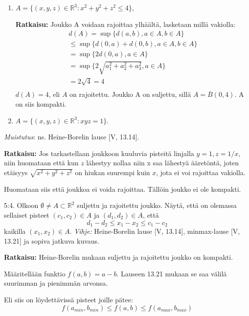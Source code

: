 \documentclass[12pt,a4paper,leqno]{amsart}
\begin{document}
\begin{enumerate}
\item $A = \{(x,y,z) \in \mathbb R^3: x^2 + y^2 + z^2 \le 4\}$, 

\textbf{Ratkaisu: } 
Joukko A voidaan rajoittaa ylhäältä, lasketaan millä vakiolla:
\begin{align*}
    d(A) = \sup \{ d(a, b), a \in A, b \in A\} \\
    \leq \sup \{ d(0, a) + d(0, b), a \in A, b \in A\} \\ 
    = \sup \{ 2 d(0, a), a \in A\}  \\
    = \sup \{ 2 \sqrt{a_1^2 + a_2^2 + a_3^2}, a \in A\} \\
    = 2 \sqrt{4} = 4\\
\end{align*}
$d(A) = 4$, eli $A$ on rajoitettu.
Joukko A on suljettu, sillä $A = \overline{B}(0, 4)$.
A on siis kompakti.
\smallskip

\item $A = \{(x,y,z) \in \mathbb R^3:  xyz = 1\}$.

\end{enumerate}

\textit{Muistutus}: ns. Heine-Borelin lause [V, 13.14].

\textbf{Ratkaisu: }
Jos tarkastellaan joukkoon kuuluvia pisteitä linjalla $y=1, z = 1/x$, niin huomataan että kun $z$ lähestyy nollaa niin x saa lähestyä ääretöntä, joten etäisyys $\sqrt{x^2 + y^2 + z^2}$ on hiukan suurempi kuin $x$, jota ei voi rajoittaa vakiolla.

Huomataan siis että joukkoa ei voida rajoittaa. Tällöin joukko ei ole kompakti.


\bigskip

5:4. Olkoon $\emptyset \neq A \subset \mathbb R^2$ suljettu ja rajoitettu joukko.
Näytä, että on olemassa sellaiset pisteet $(c_1,c_2) \in A$ ja $(d_1,d_2) \in A$, että 
\[
d_1 -  d_2  \le  x_1 - x_2  \le   c_1 - c_2 
\]
kaikilla $(x_1,x_2) \in A$. 
\textit{Vihje:} Heine-Borelin lause [V, 13.14], minmax-lause   [V, 13.21]  ja sopiva jatkuva kuvaus.

\textbf{Ratkaisu: }
Heine-Borelin mukaan suljettu ja rajoitettu joukko on kompakti.

Määritellään funktio $f(a, b) = a - b$. Lauseen 13.21 mukaan se saa välilä suurimman ja pienimmän arvonsa.

Eli siis on löydettävissä pisteet joille pätee: \[f(a_{min}, b_{min}) \leq f(a, b) \leq f(a_{max}, b_{max}) \]
\end{document}
